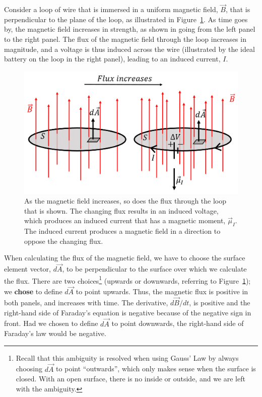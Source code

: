 Consider a loop of wire that is immersed in a uniform magnetic field, $\vec B$, that is perpendicular to the plane of the loop, as illustrated in Figure~\ref{fig:induction:faraday}. As time goes by, the magnetic field increases in strength, as shown in going from the left panel to the right panel. The flux of the magnetic field through the loop increases in magnitude, and a voltage is thus induced across the wire (illustrated by the ideal battery on the loop in the right panel), leading to an induced current, $I$.

\begin{figure}[!htbp]
\centering
\includegraphics[width=0.6\linewidth]{files/faraday-e5e8ce9b9d57169da249773be45edc7c.png}
\caption[]{As the magnetic field increases, so does the flux through the loop that is shown. The changing flux results in an induced voltage, which produces an induced current that has a magnetic moment, $\vec \mu_I$. The induced current produces a magnetic field in a direction to oppose the changing flux.}
\label{fig:induction:faraday}
\end{figure}

When calculating the flux of the magnetic field, we have to choose the surface element vector, $d\vec A$, to be perpendicular to the surface over which we calculate the flux. There are two choices\footnote{Recall that this ambiguity is resolved when using Gauss' Law by always choosing $d\vec A$ to point ``outwards'', which only makes sense when the surface is closed. With an open surface, there is no inside or outside, and we are left with the ambiguity.} (upwards or downwards, referring to Figure~\ref{fig:induction:faraday}); we \textbf{chose} to define $d\vec A$ to point upwards. Thus, the magnetic flux is positive in both panels, and increases with time. The derivative, $d\vec B/dt$, is positive and the right-hand side of Faraday's equation is negative because of the negative sign in front. Had we chosen to define $d\vec A$ to point downwards, the right-hand side of Faraday's law would be negative.

